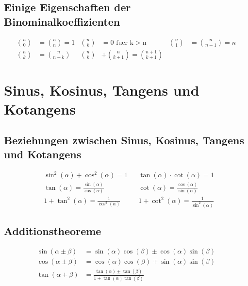 	\subsection*{Einige Eigenschaften der Binominalkoeffizienten}		
			\begin{align*}
				\binom{n}{0} &= \binom{n}{n} = 1 & \binom{n}{k} &= 0 \text{ fuer k} > \text{n} & \binom{n}{1} &= \binom{n}{n-1} = n
				\\
				\binom{n}{k} &= \binom{n}{n-k} & \binom{n}{k} &+ \binom{n}{k+1} = \binom{n+1}{k+1}
			\end{align*}			
	\vspace{10mm}
	\section{Sinus, Kosinus, Tangens und Kotangens}
	
	\vspace{10mm}
	\subsection{Beziehungen zwischen Sinus, Kosinus, Tangens und Kotangens}
		\begin{align*}
			&\sin^2 \left( \alpha \right) + \cos^2 \left( \alpha \right) = 1 & &\tan \left( \alpha \right) \cdot \cot \left( \alpha \right) = 1	
			\\
			&\tan \left( \alpha \right) = \frac{\sin \left( \alpha \right)}{\cos \left( \alpha \right)} & &\cot \left( \alpha \right) = \frac{\cos \left( \alpha \right)}{\sin \left( \alpha \right)} 
			\\
			&1 + \tan^2 \left( \alpha \right) = \frac{1}{\cos^2 \left( \alpha \right)} & &1 + \cot^2 \left( \alpha \right) = \frac{1}{\sin^2 \left( \alpha \right)}
		\end{align*}	
	\vspace{10mm}
	\subsection{Additionstheoreme}
		\begin{align*}
			\sin \left( \alpha \pm \beta \right) &= \sin \left( \alpha \right) \cos \left( \beta \right) \pm \cos \left( \alpha \right) \sin \left( \beta \right)
			\\ 
			\cos \left( \alpha \pm \beta \right) &= \cos \left( \alpha \right) \cos \left( \beta \right) \mp \sin \left( \alpha \right) \sin \left( \beta \right)
			\\
			\tan \left( \alpha \pm \beta \right) &= \frac{\tan \left( \alpha \right) \pm \tan \left( \beta \right)}{1 \mp \tan \left( \alpha \right) \tan \left( \beta \right)}
		\end{align*}
		
